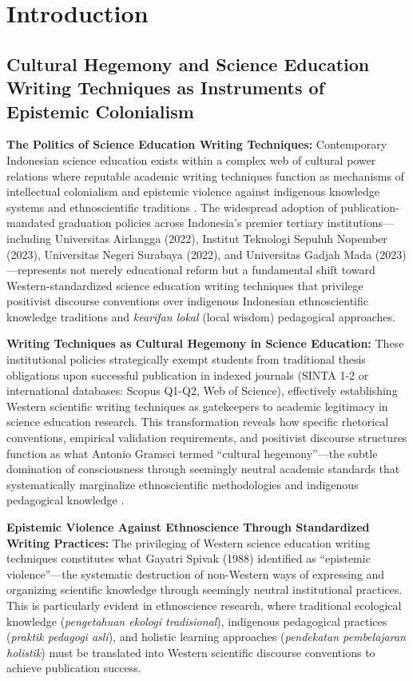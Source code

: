\documentclass[journal,article,submit,pdftex,moreauthors]{Definitions/mdpi}
\begin{document}
\section{Introduction}

\subsection{Cultural Hegemony and Science Education Writing Techniques as Instruments of Epistemic Colonialism}

\textbf{The Politics of Science Education Writing Techniques:} Contemporary Indonesian science education exists within a complex web of cultural power relations where reputable academic writing techniques function as mechanisms of intellectual colonialism and epistemic violence against indigenous knowledge systems and ethnoscientific traditions \citep{santos2007,mignolo2011}. The widespread adoption of publication-mandated graduation policies across Indonesia's premier tertiary institutions—including Universitas Airlangga (2022), Institut Teknologi Sepuluh Nopember (2023), Universitas Negeri Surabaya (2022), and Universitas Gadjah Mada (2023)—represents not merely educational reform but a fundamental shift toward Western-standardized science education writing techniques that privilege positivist discourse conventions over indigenous Indonesian ethnoscientific knowledge traditions and \textit{kearifan lokal} (local wisdom) pedagogical approaches.

\textbf{Writing Techniques as Cultural Hegemony in Science Education:} These institutional policies strategically exempt students from traditional thesis obligations upon successful publication in indexed journals (SINTA 1-2 or international databases: Scopus Q1-Q2, Web of Science), effectively establishing Western scientific writing techniques as gatekeepers to academic legitimacy in science education research. This transformation reveals how specific rhetorical conventions, empirical validation requirements, and positivist discourse structures function as what Antonio Gramsci termed ``cultural hegemony''—the subtle domination of consciousness through seemingly neutral academic standards that systematically marginalize ethnoscientific methodologies and indigenous pedagogical knowledge \citep{bourdieu1986}.

\textbf{Epistemic Violence Against Ethnoscience Through Standardized Writing Practices:} The privileging of Western science education writing techniques constitutes what Gayatri Spivak (1988) identified as ``epistemic violence''—the systematic destruction of non-Western ways of expressing and organizing scientific knowledge through seemingly neutral institutional practices. This is particularly evident in ethnoscience research, where traditional ecological knowledge (\textit{pengetahuan ekologi tradisional}), indigenous pedagogical practices (\textit{praktik pedagogi asli}), and holistic learning approaches (\textit{pendekatan pembelajaran holistik}) must be translated into Western scientific discourse conventions to achieve publication success.
\end{document}
